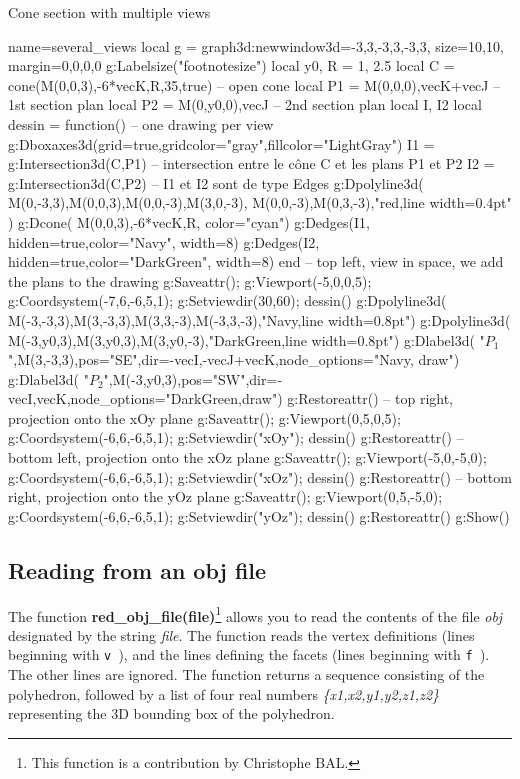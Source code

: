 \begin{demo}{Cone section with multiple views}
\begin{luadraw}{name=several_views}
local g = graph3d:new{window3d={-3,3,-3,3,-3,3}, size={10,10}, margin={0,0,0,0}}
g:Labelsize("footnotesize")
local y0, R = 1, 2.5
local C = cone(M(0,0,3),-6*vecK,R,35,true) -- open cone
local P1 = {M(0,0,0),vecK+vecJ} -- 1st section plan
local P2 = {M(0,y0,0),vecJ} -- 2nd section plan
local I, I2 
local dessin = function() -- one drawing per view
    g:Dboxaxes3d({grid=true,gridcolor="gray",fillcolor="LightGray"})
    I1 = g:Intersection3d(C,P1) -- intersection entre le cône C et les plans P1 et P2
    I2 = g:Intersection3d(C,P2) -- I1 et I2 sont de type Edges
    g:Dpolyline3d( {{M(0,-3,3),M(0,0,3),M(0,0,-3),M(3,0,-3)}, {M(0,0,-3),M(0,3,-3)}},"red,line width=0.4pt" )
    g:Dcone( M(0,0,3),-6*vecK,R, {color="cyan"})
    g:Dedges(I1, {hidden=true,color="Navy", width=8})
    g:Dedges(I2, {hidden=true,color="DarkGreen", width=8})
end
-- top left, view in space, we add the plans to the drawing
g:Saveattr(); g:Viewport(-5,0,0,5); g:Coordsystem(-7,6,-6,5,1); g:Setviewdir(30,60); dessin()
g:Dpolyline3d( {M(-3,-3,3),M(3,-3,3),M(3,3,-3),M(-3,3,-3)},"Navy,line width=0.8pt")
g:Dpolyline3d( {M(-3,y0,3),M(3,y0,3),M(3,y0,-3)},"DarkGreen,line width=0.8pt")
g:Dlabel3d( "$P_1$",M(3,-3,3),{pos="SE",dir={-vecI,-vecJ+vecK},node_options="Navy, draw"})
g:Dlabel3d( "$P_2$",M(-3,y0,3),{pos="SW",dir={-vecI,vecK},node_options="DarkGreen,draw"})
g:Restoreattr()
-- top right, projection onto the xOy plane
g:Saveattr(); g:Viewport(0,5,0,5); g:Coordsystem(-6,6,-6,5,1); g:Setviewdir("xOy"); dessin()
g:Restoreattr()
-- bottom left, projection onto the xOz plane
g:Saveattr(); g:Viewport(-5,0,-5,0); g:Coordsystem(-6,6,-6,5,1); g:Setviewdir("xOz"); dessin()
g:Restoreattr()
-- bottom right, projection onto the yOz plane
g:Saveattr(); g:Viewport(0,5,-5,0); g:Coordsystem(-6,6,-6,5,1); g:Setviewdir("yOz"); dessin()
g:Restoreattr()
g:Show()
\end{luadraw}
\end{demo}

\subsection{Reading from an obj file}

The function \textbf{red\_obj\_file(file)}\footnote{This function is a contribution by Christophe BAL.} allows you to read the contents of the file \emph{obj} designated by the string \emph{file}. The function reads the vertex definitions (lines beginning with \verb|v |), and the lines defining the facets (lines beginning with \verb|f |). The other lines are ignored. The function returns a sequence consisting of the polyhedron, followed by a list of four real numbers \emph{\{x1,x2,y1,y2,z1,z2\}} representing the 3D bounding box of the polyhedron.

